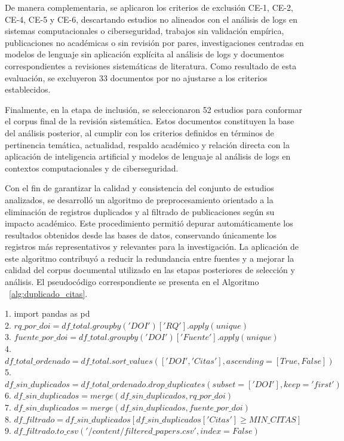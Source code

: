 De manera complementaria, se aplicaron los criterios de exclusión CE-1, CE-2, CE-4, CE-5 y CE-6, descartando estudios no alineados con el análisis de logs en sistemas computacionales o ciberseguridad, trabajos sin validación empírica, publicaciones no académicas o sin revisión por pares, investigaciones centradas en modelos de lenguaje sin aplicación explícita al análisis de logs y documentos correspondientes a revisiones sistemáticas de literatura. Como resultado de esta evaluación, se excluyeron 33 documentos por no ajustarse a los criterios establecidos.

Finalmente, en la etapa de inclusión, se seleccionaron 52 estudios para conformar el corpus final de la revisión sistemática. Estos documentos constituyen la base del análisis posterior, al cumplir con los criterios definidos en términos de pertinencia temática, actualidad, respaldo académico y relación directa con la aplicación de inteligencia artificial y modelos de lenguaje al análisis de logs en contextos computacionales y de ciberseguridad.


Con el fin de garantizar la calidad y consistencia del conjunto de estudios analizados, se desarrolló un algoritmo de preprocesamiento orientado a la eliminación de registros duplicados y al filtrado de publicaciones según su impacto académico. Este procedimiento permitió depurar automáticamente los resultados obtenidos desde las bases de datos, conservando únicamente los registros más representativos y relevantes para la investigación. La aplicación de este algoritmo contribuyó a reducir la redundancia entre fuentes y a mejorar la calidad del corpus documental utilizado en las etapas posteriores de selección y análisis. El pseudocódigo correspondiente se presenta en el Algoritmo ~\ref{alg:duplicado_citas}.\\

\begin{algorithm}[H]
\setlength{\algomargin}{0.6em}
\caption{DOI duplicate removal and citation filtering}
\label{alg:duplicado_citas}

1. import pandas as pd\\
2. $rq\_por\_doi=df\_total.groupby('DOI')['RQ'].apply(unique)$\\
3. $fuente\_por\_doi=df\_total.groupby('DOI')['Fuente'].apply(unique)$\\
4. $df\_total\_ordenado=df\_total.sort\_values(['DOI','Citas'],ascending=[True,False])$\\
5. $df\_sin\_duplicados=df\_total\_ordenado.drop\_duplicates(subset= ['DOI'],keep='first')$\\
6. $df\_sin\_duplicados=merge(df\_sin\_duplicados,rq\_por\_doi)$\\
7. $df\_sin\_duplicados=merge(df\_sin\_duplicados,fuente\_por\_doi)$\\
8. $df\_filtrado=df\_sin\_duplicados[df\_sin\_duplicados['Citas']\geq MIN\_CITAS]$\\
9. $df\_filtrado.to\_csv('/content/filtered\_papers.csv',index=False)$

\end{algorithm}


